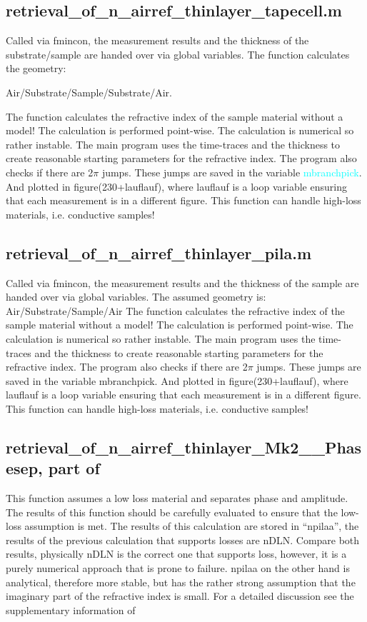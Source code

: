 \documentclass[12pt]{article}
\begin{document}
\subsection{retrieval\_of\_n\_airref\_thinlayer\_tapecell.m}
Called via fmincon, the measurement results and the thickness of the substrate/sample are handed over via global variables. The function calculates the geometry:

Air/Substrate/Sample/Substrate/Air.

The function calculates the refractive index of the sample material without a model! The calculation is performed point-wise. The calculation is numerical so rather instable. The main program uses the time-traces and the thickness to create reasonable starting parameters for the refractive index. The program also checks if there are 2$\pi$ jumps. These jumps are saved in the variable \textcolor{cyan}{mbranchpick}. And plotted in figure(230+lauflauf), where lauflauf is a loop variable ensuring that each measurement is in a different figure. 
This function can handle high-loss materials, i.e. conductive samples! 

\subsection{retrieval\_of\_n\_airref\_thinlayer\_pila.m}
Called via fmincon, the measurement results and the thickness of the sample are handed over via global variables. The assumed geometry is:
Air/Substrate/Sample/Air 
The function calculates the refractive index of the sample material without a model! The calculation is performed point-wise. The calculation is numerical so rather instable. The main program uses the time-traces and the thickness to create reasonable starting parameters for the refractive index. The program also checks if there are 2$\pi$ jumps. These jumps are saved in the variable mbranchpick. And plotted in figure(230+lauflauf), where lauflauf is a loop variable ensuring that each measurement is in a different figure. 
This function can handle high-loss materials, i.e. conductive samples! 

\subsection{ retrieval\_of\_n\_airref\_thinlayer\_Mk2\_\_Phasesep, part of \TDS}
This function assumes a low loss material and separates phase and amplitude. The results of this function should be carefully evaluated to ensure that the low-loss assumption is met. 
The results of this calculation are stored in "`npilaa"', the results of the previous calculation that supports losses are nDLN. Compare both results, physically nDLN is the correct one that supports loss, however, it is a purely numerical approach that is prone to failure. npilaa on the other hand is analytical, therefore more stable, but has the rather strong assumption that the imaginary part of the refractive index is small. For a detailed discussion see the supplementary information of \cite{neu2017PCCP} %
\end{document}

